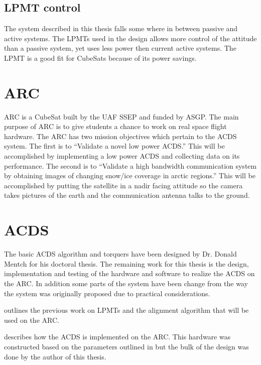 \subsection{\acl{LPMT} control}

The system described in this thesis falls some where in between passive and active systems. The \acp{LPMT} used in the design allows more control of the attitude than a passive system, yet uses less power then current active systems. The \ac{LPMT} is a good fit for CubeSats because of its power savings.

\section{\acl{ARC}}

\ac{ARC} is a CubeSat built by the \ac{UAF} \ac{SSEP} and funded by \ac{ASGP}. The main purpose of \ac{ARC} is to give students a chance to work on real space flight hardware. The \ac{ARC} has two mission objectives which pertain to the \ac{ACDS} system. The first is to ``Validate a novel low power \ac{ACDS}.''\cite{ARCweb} This will be accomplished by implementing a low power \ac{ACDS} and collecting data on its performance. The second is to ``Validate a high bandwidth communication system by obtaining images of changing snow/ice coverage in arctic regions.''\cite{ARCweb} This will be accomplished by putting the satellite in a nadir facing attitude so the camera takes pictures of the earth and the communication antenna talks to the ground.

\section{\acl{ACDS}}

The basic \ac{ACDS} algorithm and torquers have been designed by Dr. Donald Mentch for his doctoral thesis. The remaining work for this thesis is the design, implementation and testing of the hardware and software to realize the \ac{ACDS} on the \ac{ARC}. In addition some parts of the system have been change from the way the system was originally proposed due to practical considerations.

 outlines the previous work on \acp{LPMT} and the alignment algorithm that will be used on the \ac{ARC}.

 describes how the \ac{ACDS} is implemented on the \ac{ARC}. This hardware was constructed based on the parameters outlined in \cite{Mentch11} but the bulk of the design was done by the author of this thesis.

